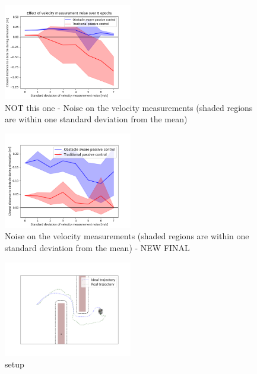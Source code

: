 \documentclass[conference]{IEEEtran}
\begin{document}
\begin{figure}
\centerline{\includegraphics[width=0.5\textwidth]{figures/vel_noise_0.png}}
\caption{ NOT this one - Noise on the velocity measurements (shaded regions are within one standard deviation from the mean)}
\label{fig_vel_noise}
\end{figure}

\begin{figure}
\centerline{\includegraphics[width=0.5\textwidth]{figures/vel_noise_cliped_0.png}}
\caption{Noise on the velocity measurements (shaded regions are within one standard deviation from the mean) - NEW FINAL }
\label{fig_vel_noise}
\end{figure}

\begin{figure}
\centerline{\includegraphics[width=0.5\textwidth]{figures/noise_setup.png}}
\caption{setup}
\label{fig_vel_noise}
\end{figure}
\end{document}
